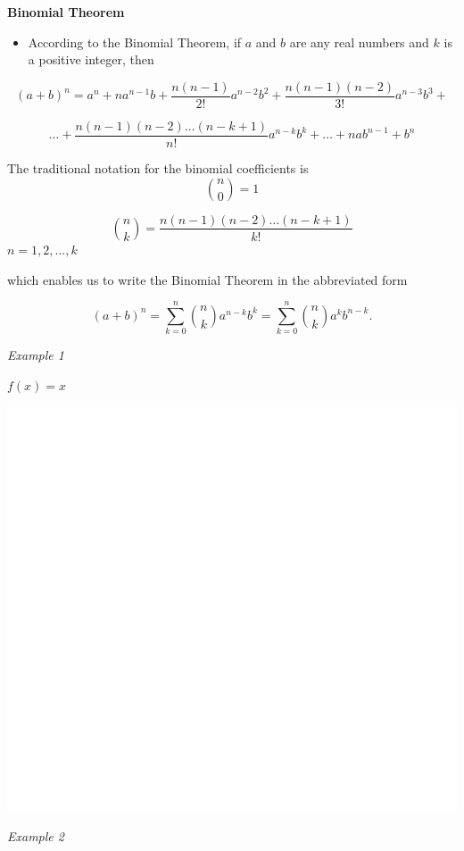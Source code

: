 \documentclass[]{book}
\providecommand{\tightlist}{%
  \setlength{\itemsep}{0pt}\setlength{\parskip}{0pt}}
\begin{document}
\textbf{Binomial Theorem}

\begin{itemize}
\tightlist
\item
  According to the Binomial Theorem, if \(a\) and \(b\) are any real numbers and \(k\) is a positive integer, then
\end{itemize}

\[(a+b)^n = a^n + na^{n-1}b+\frac{n(n-1)}{2!}a^{n-2}b^2+
  \frac{n(n-1)(n-2)}{3!}a^{n-3}b^3 +\]

\[\dots + \frac{n(n-1)(n-2)\dots (n-k+1)}{n!}a^{n-k}b^k + \dots + nab^{n-1}+b^n\]

The traditional notation for the binomial coefficients is
\[{n \choose 0}=1\]

\[{n \choose k}=\frac{n(n-1)(n-2)\dots (n-k+1)}{k!}\] \(n=1,2,\dots, k\)

which enables us to write the Binomial Theorem in the abbreviated form

\[(a+b)^n = \sum_{k=0}^n {n \choose k }a^{n-k}b^k = \sum_{k=0}^n {n \choose k }a^{k}b^{n-k}.\]

\emph{Example 1}

\(f(x)=x\)

\begin{center}\includegraphics[width=1\linewidth]{figure/LB3-1} \end{center}

\newpage

\emph{Example 2}
\end{document}
